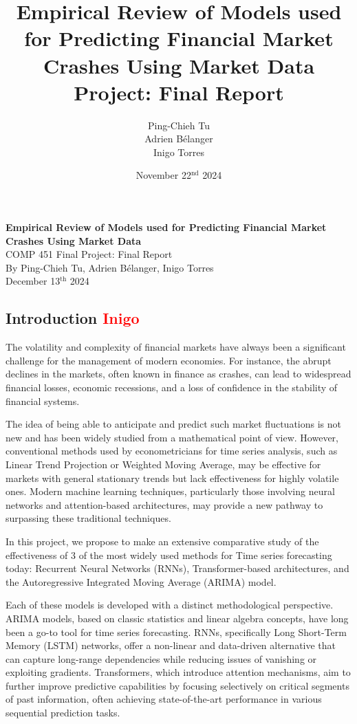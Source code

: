 \documentclass[12pt, letterpaper]{article}
\title{
    Empirical Review of Models used for Predicting Financial Market Crashes Using Market Data 
    \vspace{1em} \\
    {\large Project: Final Report}
}
\author{\normalsize Ping-Chieh Tu \\ Adrien Bélanger \\ Inigo Torres}
\date{\vspace{2em} November 22$^{\text{nd}}$ 2024}
\begin{document}
\begin{titlepage}
    \centering
    \vspace*{2in}
    {\LARGE \textbf{Empirical Review of Models used for Predicting Financial Market Crashes Using Market Data}}\\
    \vspace*{0.5in}
    {\large COMP 451 Final Project: Final Report}\\[4in]
    \normalsize
    By Ping-Chieh Tu, Adrien Bélanger, Inigo Torres \\ [3em]
    December 13$^{\text{th}}$ 2024
\end{titlepage}
\pagebreak

\subsection*{Introduction \textcolor{red}{Inigo}}

The volatility and complexity of financial markets have always been a significant challenge for the management of modern economies. 
For instance, the abrupt declines in the markets, often known in finance as crashes, can lead to widespread financial losses, economic recessions, and a loss of confidence in the stability of financial systems. 

The idea of being able to anticipate and predict such market fluctuations is not new and has been widely studied from a mathematical point of view. 
However, conventional methods used by econometricians for time series analysis, such as Linear Trend Projection or Weighted Moving Average, may be effective for markets with general stationary trends but lack effectiveness for highly volatile ones. 
Modern machine learning techniques, particularly those involving neural networks and attention-based architectures, may provide a new pathway to surpassing these traditional techniques.

In this project, we propose to make an extensive comparative study of the effectiveness of 3 of the most widely used methods for Time series forecasting today: Recurrent Neural Networks (RNNs), Transformer-based architectures, and the Autoregressive Integrated Moving Average (ARIMA) model. 

Each of these models is developed with a distinct methodological perspective. 
ARIMA models, based on classic statistics and linear algebra concepts, have long been a go-to tool for time series forecasting. 
RNNs, specifically Long Short-Term Memory (LSTM) networks, offer a non-linear and data-driven alternative that can capture long-range dependencies while reducing issues of vanishing or exploiting gradients. 
Transformers, which introduce attention mechanisms, aim to further improve predictive capabilities by focusing selectively on critical segments of past information, often achieving state-of-the-art performance in various sequential prediction tasks.
\end{document}
